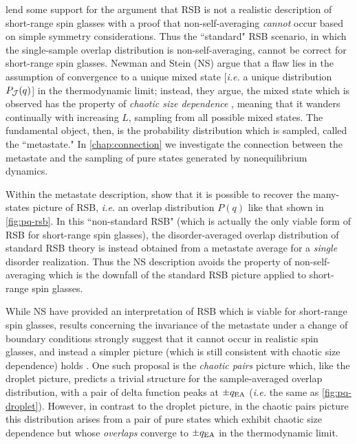 \textcite{newman1996non} lend some support for the argument that RSB is not a
realistic description of short-range spin glasses with a proof that
non-self-averaging \emph{cannot} occur based on simple symmetry considerations.
Thus the ``standard" RSB scenario, in which the single-sample overlap
distribution is non-self-averaging, cannot be correct for short-range spin
glasses. Newman and Stein (NS) argue that a flaw lies in the assumption of
convergence to a unique mixed state [\textit{i.e.} a unique distribution
$P_{\mathcal{J}}(q)$] in the thermodynamic limit; instead, they argue, the mixed state
which is observed has the property of \emph{chaotic size dependence}
\autocite{newman1992multiple}, meaning that it wanders continually with
increasing $L$, sampling from all possible mixed states. The fundamental
object, then, is the probability distribution which is sampled, called the
``metastate." In \cref{chap:connection} we investigate the connection between
the metastate and the sampling of pure states generated by nonequilibrium
dynamics.

Within the metastate description, \textcite{newman1997metastate} show that it
is possible to recover the many-states picture of RSB, \textit{i.e.} an overlap
distribution $P(q)$ like that shown in \cref{fig:pq-rsb}. In this
``non-standard RSB" (which is actually the only viable form of RSB for
short-range spin glasses), the disorder-averaged overlap distribution of
standard RSB theory is instead obtained from a metastate average for a
\emph{single} disorder realization. Thus the NS description avoids the property
of non-self-averaging which is the downfall of the standard RSB picture applied
to short-range spin glasses.

While NS have provided an interpretation of RSB which is viable for short-range
spin glasses, results concerning the invariance of the metastate under a change
of boundary conditions strongly suggest that it cannot occur in realistic spin
glasses, and instead a simpler picture (which is still consistent with chaotic
size dependence) holds \autocite{newman1998simplicity}. One such proposal is
the \emph{chaotic pairs} picture \autocite{newman1996non} which, like the
droplet picture, predicts a trivial structure for the sample-averaged overlap
distribution, with a pair of delta function peaks at $\pm q_{\mathrm{EA}}$ (\textit{i.e.}
the same as \cref{fig:pq-droplet}). However, in contrast to the droplet
picture, in the chaotic pairs picture this distribution arises from a pair of
pure states which exhibit chaotic size dependence but whose \emph{overlaps}
converge to $\pm q_{\mathrm{EA}}$ in the thermodynamic limit.

